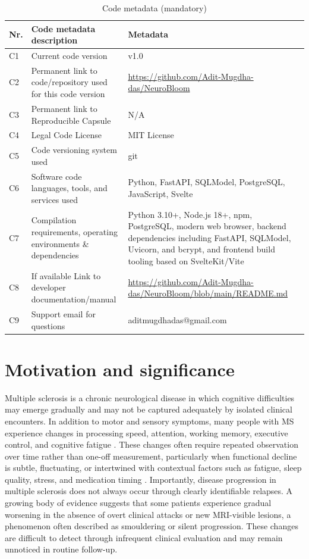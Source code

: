 \documentclass[preprint,12pt,a4paper]{elsarticle}
\begin{document}
\begin{table}[!h]
\begin{tabular}{|l|p{6.5cm}|p{6.5cm}|}
\hline
\textbf{Nr.} & \textbf{Code metadata description} & \textbf{Metadata} \\
\hline
C1 & Current code version & v1.0 \\
\hline
C2 & Permanent link to code/repository used for this code version & \url{https://github.com/Adit-Mugdha-das/NeuroBloom} \\
\hline
C3 & Permanent link to Reproducible Capsule & N/A \\
\hline
C4 & Legal Code License & MIT License \\
\hline
C5 & Code versioning system used & git \\
\hline
C6 & Software code languages, tools, and services used & Python, FastAPI, SQLModel, PostgreSQL, JavaScript, Svelte \\
\hline
C7 & Compilation requirements, operating environments \& dependencies & Python 3.10+, Node.js 18+, npm, PostgreSQL, modern web browser, backend dependencies including FastAPI, SQLModel, Uvicorn, and bcrypt, and frontend build tooling based on SvelteKit/Vite \\
\hline
C8 & If available Link to developer documentation/manual & \url{https://github.com/Adit-Mugdha-das/NeuroBloom/blob/main/README.md} \\
\hline
C9 & Support email for questions & aditmugdhadas@gmail.com \\
\hline
\end{tabular}
\caption{Code metadata (mandatory)}
\label{codeMetadata}
\end{table}
\section{Motivation and significance}
Multiple sclerosis is a chronic neurological disease in which cognitive difficulties may emerge gradually and may not be captured adequately by isolated clinical encounters. In addition to motor and sensory symptoms, many people with MS experience changes in processing speed, attention, working memory, executive control, and cognitive fatigue \cite{chiaravalloti2008,amato2006,rocca2015}. These changes often require repeated observation over time rather than one-off measurement, particularly when functional decline is subtle, fluctuating, or intertwined with contextual factors such as fatigue, sleep quality, stress, and medication timing \cite{amato2006,kalb2018}.
Importantly, disease progression in multiple sclerosis does not always occur through clearly identifiable relapses. A growing body of evidence suggests that some patients experience gradual worsening in the absence of overt clinical attacks or new MRI-visible lesions, a phenomenon often described as smouldering or silent progression. These changes are difficult to detect through infrequent clinical evaluation and may remain unnoticed in routine follow-up.
\end{document}
